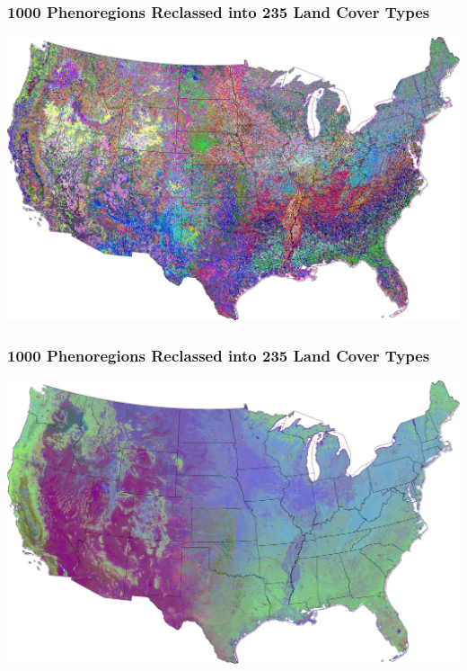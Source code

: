 \begin{frame}
 \frametitle{1000 Phenoregions Reclassed into 235 Land Cover Types}
 \includegraphics[width=\textwidth]{figures/phendump.2000-2012.1000.maxmode.reclassed_gimp.pdf}
\end{frame}

\begin{frame}
 \frametitle{1000 Phenoregions Reclassed into 235 Land Cover Types}
 \includegraphics[width=\textwidth]{figures/phendump.2000-2012.1000.maxmode.reclassed.simcolor_gimp.pdf}
\end{frame}


